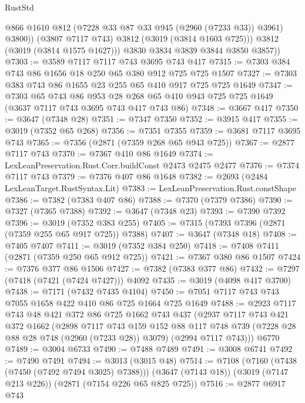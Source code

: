 \begin{lexlean}{RustStd}
\begin{coremodule}
                @866
                @1610
                @812
                (@7228 @33 @87 @33 @945 (@2960 (@7233 @33)) @3961)
                @3800))
            (@3807 @7117 @743)
            @3812
            (@3019 (@3814 @1603 @725)))
          @3812
          (@3019 (@3814 @1575 @1627)))
        @3830
        @3834
        @3839
        @3844
        @3850
        @3857))
@7303 := @3589 @7117 @7117 @743 @3695 @743 @417
@7315 := @7303 @384 @743 @86 @1656 @18 @250 @65 @380 @912 @725 @725 @1507
@7327 := @7303 @383 @743 @86 @1655 @23 @255 @65 @410 @917 @725 @725 @1649
@7347 := @7303
    @65
    @743
    @86
    @953
    @28
    @268
    @65
    @410
    @943
    @725
    @725
    @1649
    (@3637 @7117 @743 @3695 @743 @417 @743 @86)
@7348 := @3667 @417
@7350 := @3647 (@7348 @28)
@7351 := @7347 @7350
@7352 := @3915 @417
@7355 := @3019 (@7352 @65 @268)
@7356 := @7351 @7355
@7359 := @3681 @7117 @3695 @743
@7365 := @7356 (@2871 (@7359 @268 @65 @943 @725))
@7367 := @2877 @7117 @743
@7370 := @7367 @410 @86 @1649
@7374 := LexLeanPreservation.Rust.Corr.buildConst @2473 @2475 @2477
@7376 := @7374 @7117 @743
@7379 := @7376 @407 @86 @1648
@7382 := @2693 (@2484 LexLeanTarget.RustSyntax.Lit)
@7383 := LexLeanPreservation.Rust.constShape
@7386 := @7382 (@7383 @407 @86)
@7388 := @7370 (@7379 @7386)
@7390 := @7327 (@7365 @7388)
@7392 := @3647 (@7348 @23)
@7393 := @7390 @7392
@7396 := @3019 (@7352 @383 @255)
@7405 := @7315 (@7393 @7396 (@2871 (@7359 @255 @65 @917 @725)) @7388)
@7407 := @3647 (@7348 @18)
@7408 := @7405 @7407
@7411 := @3019 (@7352 @384 @250)
@7418 := @7408 @7411 (@2871 (@7359 @250 @65 @912 @725))
@7421 := @7367 @380 @86 @1507
@7424 := @7376 @377 @86 @1506
@7427 := @7382 (@7383 @377 @86)
@7432 := @7297 (@7418 (@7421 (@7424 @7427))) @4092
@7435 := @3019 (@4098 @417 @3700)
@7438 := @7171 (@7432 @7435 @4104)
@7450 := @7051 @7117 @743 @743 @7055 @1658 @422 @410 @86 @725 @1664 @725 @1649
@7488 := @2923
    @7117
    @743
    @48
    @421
    @372
    @86
    @725
    @1662
    @743
    @437
    (@2937
      @7117
      @743
      @421
      @372
      @1662
      (@2898
        @7117
        @743
        @159
        @152
        @88
        @117
        @748
        @739
        (@7228 @28 @88 @28 @748 (@2960 (@7233 @28)) @3079)
        (@2994 @7117 @743)))
    @6770
@7489 := @3004 @6733
@7490 := @7488 @7489
@7491 := @3008 @6741
@7492 := @7490 @7491
@7494 := @3013 (@3015 @48)
@7514 := @7108
    (@7160 (@7438 (@7450 (@7492 @7494 @3025) @7388)))
    (@3647 (@7143 @18))
    (@3019 (@7147 @213 @226))
    (@2871 (@7154 @226 @65 @825 @725))
@7516 := @2877 @6917 @743

\end{coremodule}
\end{lexlean}
